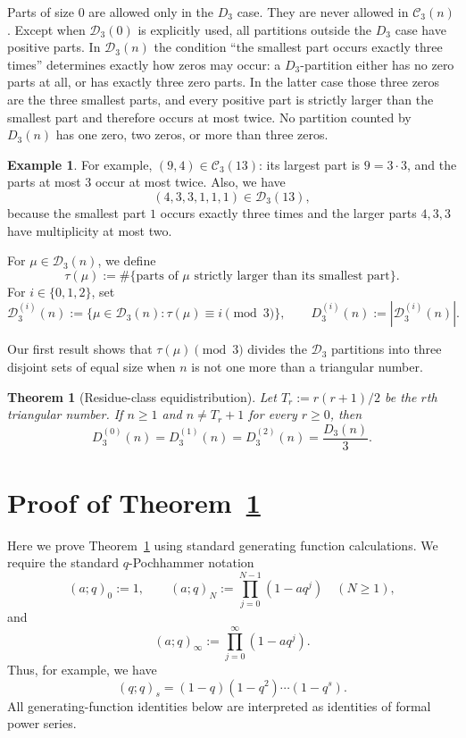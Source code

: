 \documentclass[11pt]{amsart}
\newtheorem{theorem}{Theorem}
\theoremstyle{definition}
\newtheorem*{example}{Example}
\theoremstyle{remark}
\newcommand{\C}{\mathcal C}
\newcommand{\D}{\mathcal D}
\begin{document}
Parts of size $0$ are allowed only in the $D_3$ case.  They are never allowed in $\C_3(n)$.  Except when $\D_3(0)$ is explicitly used, all partitions outside the $D_3$ case have positive parts.  In $\D_3(n)$ the condition ``the smallest part occurs exactly three times'' determines exactly how zeros may occur: a $D_3$-partition either has no zero parts at all, or has exactly three zero parts.  In the latter case those three zeros are the three smallest parts, and every positive part is strictly larger than the smallest part and therefore occurs at most twice.  No partition counted by $D_3(n)$ has one zero, two zeros, or more than three zeros.

\begin{example}
For example, $(9,4)\in\C_3(13)$: its largest part is $9=3\cdot3$, and the parts at most $3$ occur at most twice.  Also, we have
\[
       (4,3,3,1,1,1)\in\D_3(13),
\]
because the smallest part $1$ occurs exactly three times and the larger parts $4,3,3$ have multiplicity at most two.
\end{example}


For $\mu\in\D_3(n)$, we define
\[
   \tau(\mu):=\#\{\text{parts of }\mu\text{ strictly larger than its smallest part}\}.
\]
For $i\in\{0,1,2\}$, set
\[
   \D_3^{(i)}(n):=\{\mu\in\D_3(n):\tau(\mu)\equiv i\pmod3\},
   \qquad
   D_3^{(i)}(n):=|\D_3^{(i)}(n)|.
\]

Our first result shows that $\tau(\mu)\pmod 3$ divides the $\D_3$ partitions into three disjoint sets of equal size when $n$ is not one more than a triangular number.

\begin{theorem}[Residue-class equidistribution]\label{thm:thm1}
Let $T_r:=r(r+1)/2$ be the $r$th triangular number.  If $n\ge1$ and $n\ne T_r+1$ for every $r\ge0$, then
\[
        D_3^{(0)}(n)=D_3^{(1)}(n)=D_3^{(2)}(n)=\frac{D_3(n)}3.
\]
\end{theorem}



\section{Proof of Theorem~\ref{thm:thm1}}\label{sec:proof}
Here we prove Theorem~\ref{thm:thm1} using standard generating function calculations.
We require  the standard \(q\)-Pochhammer notation
\[
(a;q)_0:=1,\qquad
(a;q)_N:=\prod_{j=0}^{N-1}(1-aq^j)\quad (N\geq 1),
\]
and
\[
(a;q)_\infty:=\prod_{j=0}^{\infty}(1-aq^j).
\]
Thus, for example, we have
\[
(q;q)_s=(1-q)(1-q^2)\cdots(1-q^s).
\]
All generating-function identities below are interpreted as identities of
formal power series.
\end{document}
